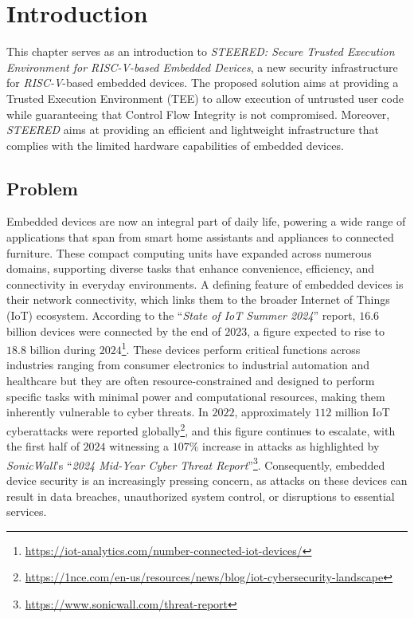 \chapter{Introduction}
\label{cha:introduction}

This chapter serves as an introduction to \textit{STEERED: Secure Trusted Execution
Environment for RISC-V-based Embedded Devices}, a new security infrastructure
for \textit{RISC-V}-based embedded devices. The proposed solution aims at
providing a Trusted Execution Environment (TEE) to allow execution of untrusted
user code while guaranteeing that Control Flow Integrity is not compromised. Moreover,
\textit{STEERED} aims at providing an efficient and lightweight infrastructure that
complies with the limited hardware capabilities of embedded devices.

\section{Problem}
\label{sec:intro_context}

Embedded devices are now an integral part of daily life, powering a wide range of
applications that span from smart home assistants and appliances to connected furniture.
These compact computing units have expanded across numerous domains, supporting diverse
tasks that enhance convenience, efficiency, and connectivity in everyday environments.
A defining feature of embedded devices is their network connectivity, which links
them to the broader Internet of Things (IoT) ecosystem. According to the ``\textit{State
of IoT Summer 2024}'' report, $16.6$ billion devices were connected by the end
of $2023$, a figure expected to rise to $18.8$ billion during $2024$\footnote{\url{https://iot-analytics.com/number-connected-iot-devices/}}.
These devices perform critical functions across industries ranging from consumer
electronics to industrial automation and healthcare but they are often resource-constrained
and designed to perform specific tasks with minimal power and computational resources,
making them inherently vulnerable to cyber threats. In $2022$, approximately
$112$ million IoT cyberattacks were reported globally\footnote{\url{https://1nce.com/en-us/resources/news/blog/iot-cybersecurity-landscape}},
and this figure continues to escalate, with the first half of $2024$ witnessing a
$107\%$ increase in attacks as highlighted by \textit{SonicWall}'s ``\textit{2024
Mid-Year Cyber Threat Report}''\footnote{\url{https://www.sonicwall.com/threat-report}}.
Consequently, embedded device security is an increasingly pressing concern, as attacks
on these devices can result in data breaches, unauthorized system control, or disruptions
to essential services.

